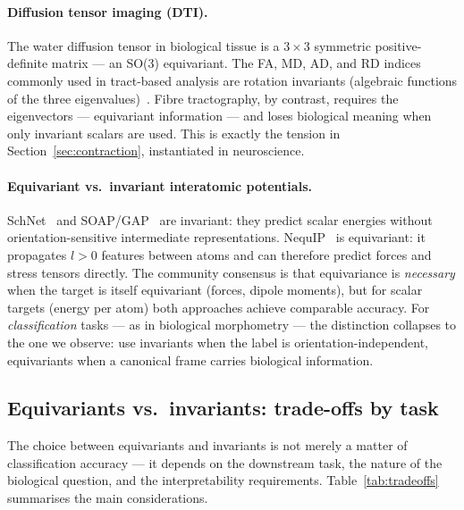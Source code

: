 \documentclass[11pt,a4paper]{article}
\begin{document}
\paragraph{Diffusion tensor imaging (DTI).}
The water diffusion tensor in biological tissue is a $3\times3$ symmetric
positive-definite matrix --- an SO(3) equivariant.
The FA, MD, AD, and RD indices commonly used in tract-based analysis are rotation
invariants (algebraic functions of the three eigenvalues)~\cite{BasserPierpaoli1996}.
Fibre tractography, by contrast, requires the eigenvectors --- equivariant
information --- and loses biological meaning when only invariant scalars are used.
This is exactly the tension in Section~\ref{sec:contraction}, instantiated in
neuroscience.

\paragraph{Equivariant vs.\ invariant interatomic potentials.}
SchNet~\cite{Schutt2018SchNet} and SOAP/GAP~\cite{Bartok2013} are invariant:
they predict scalar energies without orientation-sensitive intermediate representations.
NequIP~\cite{Batzner2022} is equivariant: it propagates $l>0$ features between
atoms and can therefore predict forces and stress tensors directly.
The community consensus is that equivariance is \emph{necessary} when the target
is itself equivariant (forces, dipole moments), but for scalar targets (energy per
atom) both approaches achieve comparable accuracy.
For \emph{classification} tasks --- as in biological morphometry --- the distinction
collapses to the one we observe: use invariants when the label is
orientation-independent, equivariants when a canonical frame carries biological
information.

\subsection*{Equivariants vs.\ invariants: trade-offs by task}

The choice between equivariants and invariants is not merely a matter of
classification accuracy --- it depends on the downstream task, the nature of the
biological question, and the interpretability requirements.
Table~\ref{tab:tradeoffs} summarises the main considerations.
\end{document}
